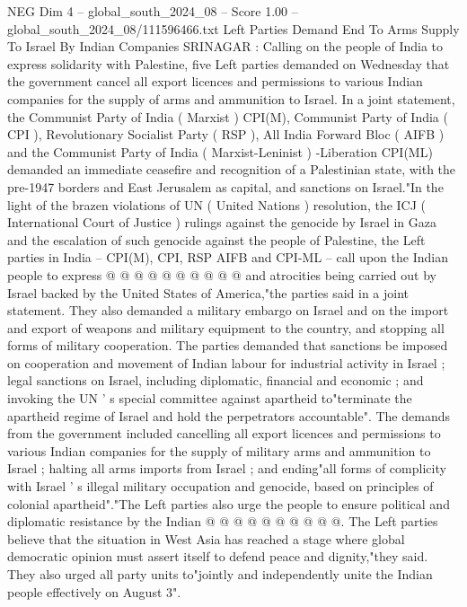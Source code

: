 \begin{textsample}{NEG Dim 4 – global\_south\_2024\_08 – Score 1.00 – global\_south\_2024\_08/111596466.txt}  \label{ex:f4_neg_335}
Left Parties Demand End To Arms Supply To Israel By Indian Companies SRINAGAR : Calling on the people of India to express solidarity with Palestine, five Left parties demanded on Wednesday that the government cancel all export licences and permissions to various Indian companies for the supply of arms and ammunition to Israel.
In a joint statement, the Communist Party of India ( Marxist ) CPI(M), Communist Party of India ( CPI ), Revolutionary Socialist Party ( RSP ), All India Forward Bloc ( AIFB ) and the Communist Party of India ( Marxist-Leninist ) -Liberation CPI(ML) demanded an immediate ceasefire and recognition of a Palestinian state, with the pre-1947 borders and East Jerusalem as capital, and sanctions on Israel."In the light of the brazen violations of UN ( United Nations ) resolution, the ICJ ( International Court of Justice ) rulings against the genocide by Israel in Gaza and the escalation of such genocide against the people of Palestine, the Left parties in India -- CPI(M), CPI, RSP AIFB and CPI-ML -- call upon the Indian people to express @ @ @ @ @ @ @ @ @ @ and atrocities being carried out by Israel backed by the United States of America,"the parties said in a joint statement.
They also demanded a military embargo on Israel and on the import and export of weapons and military equipment to the country, and stopping all forms of military cooperation.
The parties demanded that sanctions be imposed on cooperation and movement of Indian labour for industrial activity in Israel ; legal sanctions on Israel, including diplomatic, financial and economic ; and invoking the UN ' s special committee against apartheid to"terminate the apartheid regime of Israel and hold the perpetrators accountable".
The demands from the government included cancelling all export licences and permissions to various Indian companies for the supply of military arms and ammunition to Israel ; halting all arms imports from Israel ; and ending"all forms of complicity with Israel ' s illegal military occupation and genocide, based on principles of colonial apartheid"."The Left parties also urge the people to ensure political and diplomatic resistance by the Indian @ @ @ @ @ @ @ @ @ @.
The Left parties believe that the situation in West Asia has reached a stage where global democratic opinion must assert itself to defend peace and dignity,"they said.
They also urged all party units to"jointly and independently unite the Indian people effectively on August 3".

\end{textsample}
